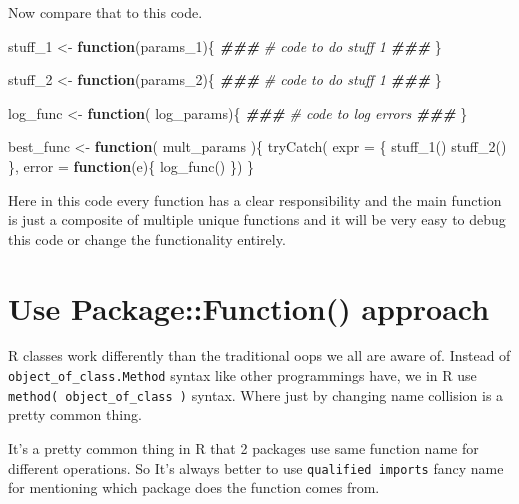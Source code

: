 \documentclass[
]{book}
\newenvironment{Shaded}{\begin{snugshade}}{\end{snugshade}}
\newcommand{\AttributeTok}[1]{\textcolor[rgb]{0.77,0.63,0.00}{#1}}
\newcommand{\CommentTok}[1]{\textcolor[rgb]{0.56,0.35,0.01}{\textit{#1}}}
\newcommand{\ControlFlowTok}[1]{\textcolor[rgb]{0.13,0.29,0.53}{\textbf{#1}}}
\newcommand{\DocumentationTok}[1]{\textcolor[rgb]{0.56,0.35,0.01}{\textbf{\textit{#1}}}}
\newcommand{\FunctionTok}[1]{\textcolor[rgb]{0.00,0.00,0.00}{#1}}
\newcommand{\NormalTok}[1]{#1}
\newcommand{\OtherTok}[1]{\textcolor[rgb]{0.56,0.35,0.01}{#1}}
\begin{document}
Now compare that to this code.

\begin{Shaded}
\begin{Highlighting}[]
\NormalTok{stuff\_1 }\OtherTok{\textless{}{-}} \ControlFlowTok{function}\NormalTok{(params\_1)\{}
  \DocumentationTok{\#\#\#}
  \CommentTok{\# code to do stuff 1}
  \DocumentationTok{\#\#\#}
\NormalTok{\}}

\NormalTok{stuff\_2 }\OtherTok{\textless{}{-}} \ControlFlowTok{function}\NormalTok{(params\_2)\{}
  \DocumentationTok{\#\#\#}
  \CommentTok{\# code to do stuff 1}
  \DocumentationTok{\#\#\#}
\NormalTok{\}}

\NormalTok{log\_func }\OtherTok{\textless{}{-}} \ControlFlowTok{function}\NormalTok{( log\_params)\{}
  \DocumentationTok{\#\#\#}
  \CommentTok{\# code to log errors}
  \DocumentationTok{\#\#\#}
\NormalTok{\}}

\NormalTok{best\_func }\OtherTok{\textless{}{-}} \ControlFlowTok{function}\NormalTok{( mult\_params )\{}
  \FunctionTok{tryCatch}\NormalTok{(}
    \AttributeTok{expr =}\NormalTok{ \{}
    \FunctionTok{stuff\_1}\NormalTok{()}
    \FunctionTok{stuff\_2}\NormalTok{()}
\NormalTok{    \},}
    \AttributeTok{error =} \ControlFlowTok{function}\NormalTok{(e)\{}
    \FunctionTok{log\_func}\NormalTok{()}
\NormalTok{    \})}
\NormalTok{\}}
\end{Highlighting}
\end{Shaded}

Here in this code every function has a clear responsibility and the main function is just a composite of multiple unique functions and it will be very easy to debug this code or change the functionality entirely.

\hypertarget{use-packagefunction-approach}{%
\section{Use Package::Function() approach}\label{use-packagefunction-approach}}

R classes work differently than the traditional oops we all are aware of. Instead of \texttt{object\_of\_class.Method} syntax like other programmings have, we in R use \texttt{method(\ object\_of\_class\ )} syntax. Where just by changing name collision is a pretty common thing.

It's a pretty common thing in R that 2 packages use same function name for different operations. So It's always better to use \texttt{qualified\ imports} fancy name for mentioning which package does the function comes from.
\end{document}
